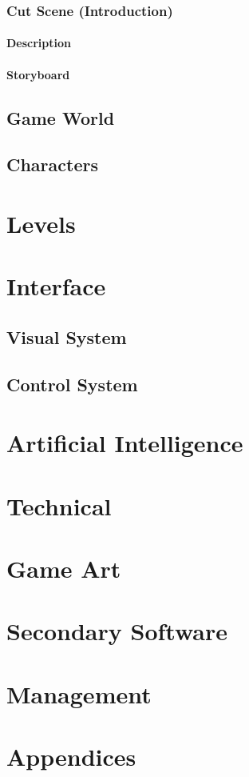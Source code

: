 \documentclass[14pts]{report}
\begin{document}
\subsection{Cut Scene (Introduction)}
\subsubsection{Description}
\subsubsection{Storyboard}

\section{Game World}

\section{Characters}

\chapter{Levels}

\chapter{Interface}
\section{Visual System}
\section{Control System}

\chapter{Artificial Intelligence}

\chapter{Technical}

\chapter{Game Art}

\chapter{Secondary Software}

\chapter{Management}

\chapter{Appendices}
\end{document}
